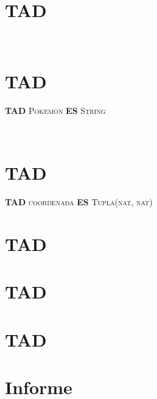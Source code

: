 \documentclass[10pt, a4paper]{article}
\begin{document}
\maketitle

\thispagestyle{fancy}


\tableofcontents

\pagebreak

\section{TAD }


$ $\newline
$ $\newline
$ $\newline
$ $\newline
\section{TAD }

\textbf{TAD} \textsc{Pokemon} \textbf{ES} \textsc{String}

$ $\newline
$ $\newline
\section{TAD }

\textbf{TAD} \textsc{coordenada} \textbf{ES} \textsc{Tupla(nat, nat)}


\newpage


\section{TAD }



%

\newpage
\section{TAD }




\newpage
\section{TAD }



\newpage
\section{Informe}


\end{document}
